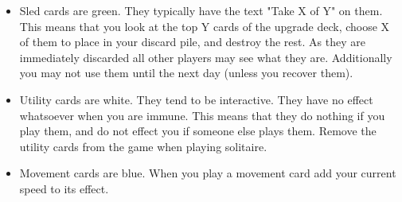 \documentclass{article}
\begin{document}
\begin{multicols}{3}
\begin{itemize}
        \item Sled cards are green. They typically have the text "Take X of Y"
            on them. This means that you look at the top Y cards of the upgrade
            deck, choose X of them to place in your discard pile, and destroy
            the rest. As they are immediately discarded all other players may
            see what they are. Additionally you may not use them until the next
            day (unless you recover them).

        \item Utility cards are white. They tend to be interactive. They have no
            effect whatsoever when you are immune. This means that they do
            nothing if you play them, and do not effect you if someone else
            plays them. Remove the utility cards from the game when playing
            solitaire.

        \item Movement cards are blue. When you play a movement card add your
            current speed to its effect.
    \end{itemize}

\end{multicols}
\end{document}
